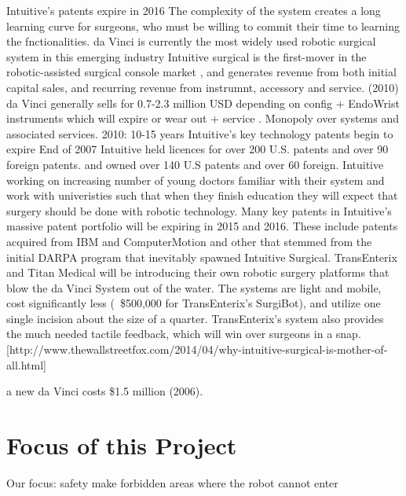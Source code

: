 Intuitive's patents expire in 2016 \citep{bib:intuitive_monopoly}
The complexity of the system creates a long learning curve for surgeons, who must be willing to commit their time to learning the fnctionalities.
da Vinci is currently the most widely used robotic surgical system in this emerging industry \citep{bib:intuitive_monopoly}
Intuitive surgical is the first-mover in the robotic-assisted surgical console market \citep{bib:intuitive_monopoly}, and generates revenue from both initial capital sales, and recurring revenue from instrumnt, accessory and service.
(2010) da Vinci generally sells for 0.7-2.3 million USD depending on config + EndoWrist instruments which will expire or wear out + service \citep{bib:intuitive_monopoly}. Monopoly over systems and associated services.
2010: 10-15 years Intuitive's key technology patents begin to expire \citep{bib:intuitive_monopoly}
End of 2007 Intuitive held licences for over 200 U.S. patents and over 90 foreign patents. and owned over 140 U.S patents and over 60 foreign.
Intuitive working on increasing number of young doctors familiar with their system and work with univeristies such that when they finish education they will expect that surgery should be done with robotic technology. \citep{bib:intuitive_monopoly}
Many key patents in Intuitive's massive patent portfolio will be expiring in 2015 and 2016. These include patents acquired from IBM and ComputerMotion and other that stemmed from the initial DARPA program that inevitably spawned Intuitive Surgical. TransEnterix and Titan Medical will be introducing their own robotic surgery platforms that blow the da Vinci System out of the water. The systems are light and mobile, cost significantly less (~\$500,000 for TransEnterix's SurgiBot), and utilize one single incision about the size of a quarter. TransEnterix's system also provides the much needed tactile feedback, which will win over surgeons in a snap. [http://www.thewallstreetfox.com/2014/04/why-intuitive-surgical-is-mother-of-all.html]

a new da Vinci costs \$1.5 million (2006).


\section{Focus of this Project}
Our focus:
safety
make forbidden areas where the robot cannot enter

